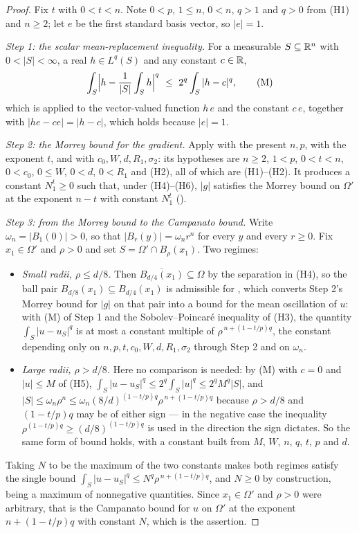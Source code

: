 \begin{proof}
Fix $t$ with $0<t<n$.  Note $0<p$, $1\le n$, $0<n$, $q>1$ and $q>0$ from (H1)
and $n\ge2$; let $e$ be the first standard basis vector, so $|e|=1$.

\emph{Step 1: the scalar mean-replacement inequality.}  For a measurable
$S\subseteq\mathbb{R}^n$ with $0<|S|<\infty$, a real $h\in L^q(S)$ and any constant
$c\in\mathbb{R}$,
\[
\int_S\Bigl|h-\frac1{|S|}\int_Sh\Bigr|^{q}
\ \le\ 2^{q}\int_S|h-c|^{q},
\tag{M}
\]
which is  applied to the vector-valued function
$h\,e$ and the constant $c\,e$, together with $|h e-c e|=|h-c|$, which holds
because $|e|=1$.

\emph{Step 2: the Morrey bound for the gradient.}  Apply
 with the present $n,p$, with the exponent $t$,
and with $c_0,W,d,R_1,\sigma_2$: its hypotheses are $n\ge2$, $1<p$, $0<t<n$,
$0<c_0$, $0\le W$, $0<d$, $0<R_1$ and (H2), all of which are (H1)--(H2).  It
produces a constant $N_1^t\ge0$ such that, under (H4)--(H6), $|g|$ satisfies the
Morrey bound on $\Omega'$ at the exponent $n-t$ with constant $N_1^t$
().

\emph{Step 3: from the Morrey bound to the Campanato bound.}  Write
$\omega_n=|B_1(0)|>0$, so that $|B_r(y)|=\omega_nr^{n}$ for every $y$ and every
$r\ge0$.  Fix $x_1\in\Omega'$ and $\rho>0$ and set $S=\Omega'\cap B_\rho(x_1)$.
Two regimes:
\begin{itemize}
\item \emph{Small radii, $\rho\le d/8$.}  Then $\overline{B_{d/4}(x_1)}\subseteq\Omega$
  by the separation in (H4), so the ball pair $B_{d/8}(x_1)\subseteq B_{d/4}(x_1)$
  is admissible for , which converts Step 2's
  Morrey bound for $|g|$ on that pair into a bound for the mean oscillation of
  $u$: with (M) of Step 1 and the Sobolev--Poincaré inequality of (H3), the
  quantity $\int_S|u-u_S|^{q}$ is at most a constant multiple of
  $\rho^{\,n+(1-t/p)q}$, the constant depending only on
  $n,p,t,c_0,W,d,R_1,\sigma_2$ through Step 2 and on $\omega_n$.
\item \emph{Large radii, $\rho>d/8$.}  Here no comparison is needed: by (M)
  with $c=0$ and $|u|\le M$ of (H5),
  $\int_S|u-u_S|^{q}\le2^{q}\int_S|u|^{q}\le2^{q}M^{q}|S|$, and
  $|S|\le\omega_n\rho^{n}\le\omega_n(8/d)^{(1-t/p)q}\rho^{\,n+(1-t/p)q}$ because
  $\rho>d/8$ and $(1-t/p)q$ may be of either sign --- in the negative case the
  inequality $\rho^{(1-t/p)q}\ge(d/8)^{(1-t/p)q}$ is used in the direction the
  sign dictates.  So the same form of bound holds, with a constant built from
  $M$, $W$, $n$, $q$, $t$, $p$ and $d$.
\end{itemize}
Taking $N$ to be the maximum of the two constants makes both regimes satisfy the
single bound $\int_S|u-u_S|^{q}\le N^{q}\rho^{\,n+(1-t/p)q}$, and $N\ge0$ by
construction, being a maximum of nonnegative quantities.  Since $x_1\in\Omega'$
and $\rho>0$ were arbitrary, that is the Campanato bound for $u$ on $\Omega'$ at
the exponent $n+(1-t/p)q$ with constant $N$, which is the assertion.
\end{proof}
